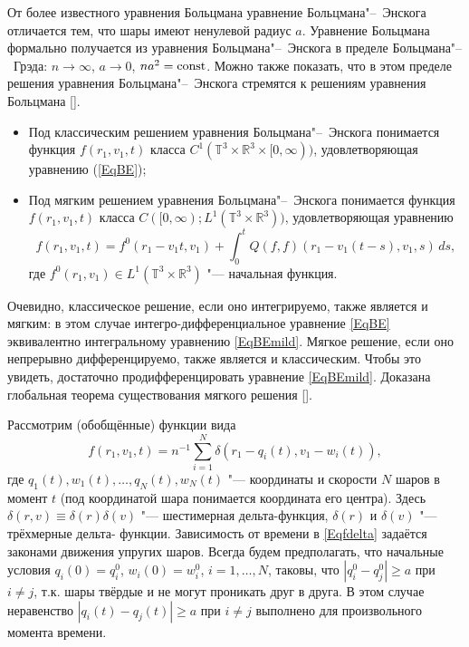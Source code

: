 От более известного уравнения Больцмана уравнение Больцмана"--~Энскога отличается тем, что шары имеют ненулевой радиус $a$. Уравнение Больцмана формально получается из уравнения Больцмана"--~Энскога в пределе Больцмана"--~Грэда: $n\to\infty$, $a\to0$, $na^2=\rm const$. Можно также показать, что в этом пределе решения уравнения Больцмана"--~Энскога стремятся к решениям уравнения Больцмана [].

\begin{definition}
\begin{itemize}
\item[1)] Под классическим решением уравнения Больцмана"--~Энскога понимается функция $f(r_1,v_1,t)$ класса $C^1(\mathbb T^3\times\mathbb R^3\times[0,\infty))$, удовлетворяющая уравнению (\ref{EqBE});

\item[2)] Под мягким решением уравнения Больцмана"--~Энскога понимается функция $f(r_1,v_1,t)$ класса $C([0,\infty); L^1(\mathbb T^3\times\mathbb R^3))$, удовлетворяющая уравнению
\begin{equation}\label{EqBEmild}
f(r_1,v_1,t)=f^0(r_1-v_1t,v_1)+\int_0^t Q(f,f)(r_1-v_1(t-s),v_1,s)\,ds,
\end{equation}
где $f^0(r_1,v_1)\in L^1(\mathbb T^3\times\mathbb R^3)$ "--- начальная функция.
\end{itemize}
\end{definition}

Очевидно, классическое решение, если оно интегрируемо, также является и мягким: в этом случае интегро-дифференциальное уравнение \eqref{EqBE} эквивалентно интегральному уравнению \eqref{EqBEmild}. Мягкое решение, если оно непрерывно дифференцируемо, также является и классическим. Чтобы это увидеть, достаточно продифференцировать уравнение \eqref{EqBEmild}. Доказана глобальная теорема существования мягкого решения [].


\smallskip
{}
Рассмотрим (обобщённые) функции вида
\begin{equation}\label{Eqfdelta}
f(r_1,v_1,t)=n^{-1}\sum_{i=1}^N\delta(r_1-q_i(t),v_1-w_i(t)),
\end{equation}
где $q_1(t),w_1(t),\ldots, q_N(t),w_N(t)$ "--- координаты и скорости $N$ шаров в момент $t$ (под координатой шара понимается координата его центра). 
Здесь $\delta(r,v)\equiv\delta(r)\delta(v)$ "--- шестимерная дельта-функция, $\delta(r)$ и $\delta(v)$ "--- трёхмерные дель\-та- \linebreak функции.  
Зависимость от времени в \eqref{Eqfdelta} задаётся
законами движения упругих шаров. Всегда будем предполагать, что начальные условия $q_i(0)=q_i^0$, $w_i(0)=w_i^0$, $i=1,  \ldots,N$, таковы, что $|q_i^0-q_j^0|\geq a$ при $i\neq j$, т.к. шары твёрдые и не могут проникать друг в друга. В этом случае неравенство $|q_i(t)-q_j(t)|\geq a$ при $i\neq j$ выполнено для произвольного момента времени.

